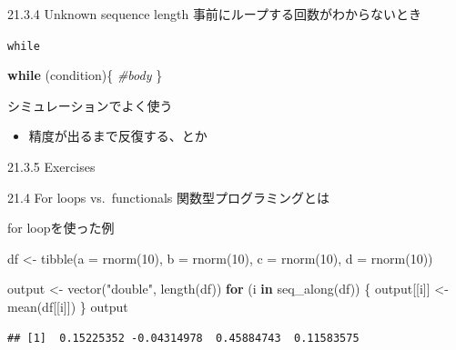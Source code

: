 \documentclass[
  ignorenonframetext,
  aspectratio=169]{beamer}
\newenvironment{Shaded}{\begin{snugshade}}{\end{snugshade}}
\newcommand{\AttributeTok}[1]{\textcolor[rgb]{0.77,0.63,0.00}{#1}}
\newcommand{\CommentTok}[1]{\textcolor[rgb]{0.56,0.35,0.01}{\textit{#1}}}
\newcommand{\ControlFlowTok}[1]{\textcolor[rgb]{0.13,0.29,0.53}{\textbf{#1}}}
\newcommand{\DecValTok}[1]{\textcolor[rgb]{0.00,0.00,0.81}{#1}}
\newcommand{\FunctionTok}[1]{\textcolor[rgb]{0.00,0.00,0.00}{#1}}
\newcommand{\NormalTok}[1]{#1}
\newcommand{\OtherTok}[1]{\textcolor[rgb]{0.56,0.35,0.01}{#1}}
\newcommand{\StringTok}[1]{\textcolor[rgb]{0.31,0.60,0.02}{#1}}
\providecommand{\tightlist}{%
  \setlength{\itemsep}{0pt}\setlength{\parskip}{0pt}}
\begin{document}
\begin{frame}{21.3.4 Unknown sequence length}
\protect\hypertarget{unknown-sequence-length}{}
事前にループする回数がわからないとき
\end{frame}

\begin{frame}[fragile]{\texttt{while}}
\protect\hypertarget{while}{}
\begin{Shaded}
\begin{Highlighting}[]
\ControlFlowTok{while}\NormalTok{ (condition)\{}
  \CommentTok{\#body}
\NormalTok{\}}
\end{Highlighting}
\end{Shaded}

シミュレーションでよく使う

\begin{itemize}
\tightlist
\item
  精度が出るまで反復する、とか
\end{itemize}
\end{frame}

\begin{frame}{21.3.5 Exercises}
\protect\hypertarget{exercises-1}{}
\end{frame}

\begin{frame}{21.4 For loops vs.~functionals}
\protect\hypertarget{for-loops-vs.-functionals}{}
関数型プログラミングとは
\end{frame}

\begin{frame}[fragile]{for loopを使った例}
\protect\hypertarget{for-loopux3092ux4f7fux3063ux305fux4f8b}{}
\begin{Shaded}
\begin{Highlighting}[]
\NormalTok{df }\OtherTok{\textless{}{-}} \FunctionTok{tibble}\NormalTok{(}\AttributeTok{a =} \FunctionTok{rnorm}\NormalTok{(}\DecValTok{10}\NormalTok{),}
         \AttributeTok{b =} \FunctionTok{rnorm}\NormalTok{(}\DecValTok{10}\NormalTok{),}
         \AttributeTok{c =} \FunctionTok{rnorm}\NormalTok{(}\DecValTok{10}\NormalTok{),}
         \AttributeTok{d =} \FunctionTok{rnorm}\NormalTok{(}\DecValTok{10}\NormalTok{))}

\NormalTok{output }\OtherTok{\textless{}{-}} \FunctionTok{vector}\NormalTok{(}\StringTok{"double"}\NormalTok{, }\FunctionTok{length}\NormalTok{(df))}
\ControlFlowTok{for}\NormalTok{ (i }\ControlFlowTok{in} \FunctionTok{seq\_along}\NormalTok{(df)) \{}
\NormalTok{    output[[i]] }\OtherTok{\textless{}{-}} \FunctionTok{mean}\NormalTok{(df[[i]])}
\NormalTok{\}}
\NormalTok{output}
\end{Highlighting}
\end{Shaded}

\begin{verbatim}
## [1]  0.15225352 -0.04314978  0.45884743  0.11583575
\end{verbatim}
\end{frame}
\end{document}
